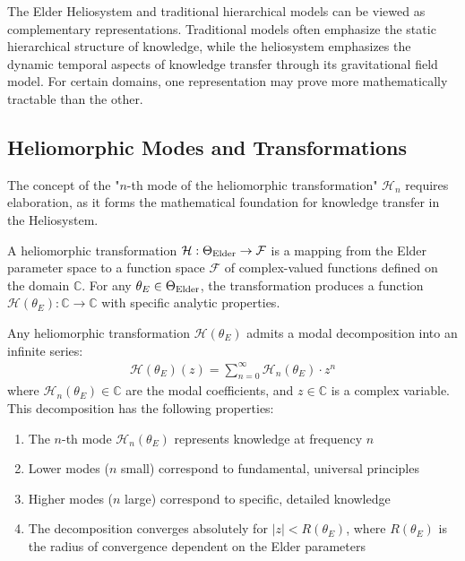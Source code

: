 \begin{remark}
The Elder Heliosystem and traditional hierarchical models can be viewed as complementary representations. Traditional models often emphasize the static hierarchical structure of knowledge, while the heliosystem emphasizes the dynamic temporal aspects of knowledge transfer through its gravitational field model. For certain domains, one representation may prove more mathematically tractable than the other.
\end{remark}

\subsection{Heliomorphic Modes and Transformations}

The concept of the "$n$-th mode of the heliomorphic transformation" $\mathcal{H}_n$ requires elaboration, as it forms the mathematical foundation for knowledge transfer in the Heliosystem.

\begin{definition}
A heliomorphic transformation $\mathcal{H}: \Theta_{\text{Elder}} \rightarrow \mathcal{F}$ is a mapping from the Elder parameter space to a function space $\mathcal{F}$ of complex-valued functions defined on the domain $\mathbb{C}$. For any $\theta_E \in \Theta_{\text{Elder}}$, the transformation produces a function $\mathcal{H}(\theta_E): \mathbb{C} \rightarrow \mathbb{C}$ with specific analytic properties.
\end{definition}

\begin{theorem}
Any heliomorphic transformation $\mathcal{H}(\theta_E)$ admits a modal decomposition into an infinite series:
\begin{align}
\mathcal{H}(\theta_E)(z) = \sum_{n=0}^{\infty} \mathcal{H}_n(\theta_E) \cdot z^n
\end{align}
where $\mathcal{H}_n(\theta_E) \in \mathbb{C}$ are the modal coefficients, and $z \in \mathbb{C}$ is a complex variable. This decomposition has the following properties:
\begin{enumerate}
    \item The $n$-th mode $\mathcal{H}_n(\theta_E)$ represents knowledge at frequency $n$
    \item Lower modes ($n$ small) correspond to fundamental, universal principles
    \item Higher modes ($n$ large) correspond to specific, detailed knowledge
    \item The decomposition converges absolutely for $|z| < R(\theta_E)$, where $R(\theta_E)$ is the radius of convergence dependent on the Elder parameters
\end{enumerate}
\end{theorem}

